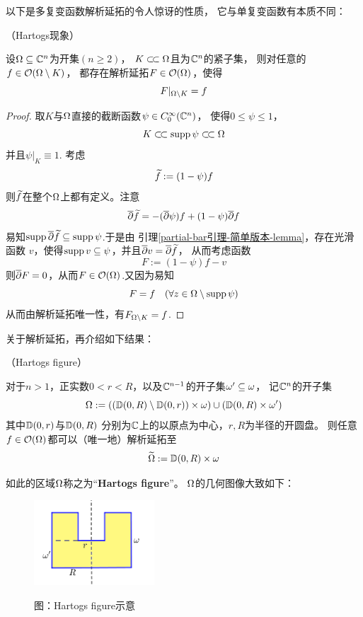 以下是多复变函数解析延拓的令人惊讶的性质，
它与单复变函数有本质不同：

\begin{thm}（Hartogs现象）

设$\Omega\subseteq\mathbb{C}^n$为开集$(n\geq 2)$，
$K\subset\!\subset\Omega$且为$\mathbb{C}^n$的紧子集，
则对任意的$f\in\mathcal{O}(\Omega\setminus K)$，
都存在解析延拓$F\in\mathcal{O}(\Omega)$，使得
$$F|_{\Omega\setminus K}=f$$
\end{thm}

\begin{proof}
取$K$与$\Omega$直接的截断函数$\psi\in C^\infty_0(\mathbb{C}^n)$，
使得$0\leq \psi\leq 1$，
$$K\subset\!\subset\operatorname{supp}\psi\subset\!\subset\Omega$$
并且$\psi|_K\equiv 1$.
考虑$$\widetilde{f}:=(1-\psi)f$$
则$\widetilde{f}$在整个$\Omega$上都有定义。注意
$$\overline{\partial}\widetilde{f}=-(\overline{\partial}\psi)f+(1-\psi)\overline{\partial} f$$
易知$\operatorname{supp}\overline{\partial}\widetilde{f}\subseteq\operatorname{supp}\psi$.于是由
引理\ref{partial-bar引理-简单版本-lemma}，存在光滑函数
$v$，使得$\operatorname{supp} v\subseteq\psi$，并且$\overline{\partial} v=\overline{\partial}\widetilde{f}$，
从而考虑函数
$$F:=(1-\psi)f-v$$
则$\overline{\partial} F=0$，从而$F\in\mathcal{O}(\Omega)$.又因为易知
$$F=f\quad(\forall z\in\Omega\setminus\operatorname{supp}\psi)$$
从而由解析延拓唯一性，有$F_{\Omega\setminus K}=f$.
\end{proof}

关于解析延拓，再介绍如下结果：

\begin{lemma}（Hartogs figure）

对于$n>1$，正实数$0<r<R$，以及$\mathbb{C}^{n-1}$的开子集$\omega'\subseteq\omega$，
记$\mathbb{C}^n$的开子集
$$
  \Omega:=
    \left(
      (\mathbb{D}(0,R)\setminus\mathbb{D}(0,r))\times\omega
    \right)
    \cup
    \left(
      \mathbb{D}(0,R)\times\omega'
    \right)
$$
其中$\mathbb{D}(0,r)$与$\mathbb{D}(0,R)$
分别为$\mathbb{C}$上的以原点为中心，$r,R$为半径的开圆盘。
则任意$f\in\mathcal{O}(\Omega)$都可以（唯一地）解析延拓至
$$\widetilde{\Omega}:=\mathbb{D}(0,R)\times\omega$$
\end{lemma}
如此的区域$\Omega$称之为“\textbf{Hartogs figure}”。
$\Omega$的几何图像大致如下：

\begin{figure}[ht]
\centering
\includegraphics[width=0.4\textwidth]
  {figures/HartogsFigure.png}

图：Hartogs figure示意
\end{figure}


